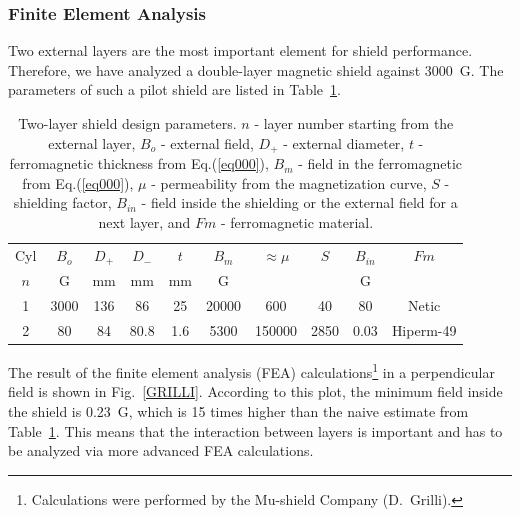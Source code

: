\subsubsection{Finite Element Analysis}

Two external layers are the most important element for shield performance.  
Therefore, we have analyzed a double-layer magnetic shield against 3000~G.  The 
parameters of such a pilot shield are listed in Table~\ref{ca001}. 

\begin{table}[htbp]
\begin{center}
\begin{tabular}{|c|c|c|c|c|c|c|c|c|c|} \hline
Cyl & $B_{o}$  & $D_+$ & $D_-$ & $t$ & $B_m$ & $\approx\mu$ & $S$  & $B_{in}$ & $Fm$      \\ 
$n$ &  G       & mm    & mm    & mm  & G     &              &      & G        &           \\ \hline  
1   & 3000     & 136   &   86  & 25  & 20000 & 600          & 40   & 80       & Netic     \\ \hline
2   & 80       &  84   &   80.8& 1.6 & 5300  & 150000       & 2850 & 0.03     & Hiperm-49 \\ \hline
\end{tabular}                                                      
\end{center}
\caption{\small{Two-layer shield design parameters. $n$ - layer number starting 
from the external layer, $B_{o}$ - external field, $D_+$ - external diameter, 
$t$ - ferromagnetic thickness from Eq.(\ref{eq000}), $B_m$ - field in the 
ferromagnetic from Eq.(\ref{eq000}), $\mu$ - permeability from the magnetization 
curve, $S$ - shielding factor, $B_{in}$ - field inside the shielding or the external 
field for a next layer, and $Fm$ - ferromagnetic material.}}
\label{ca001}
\end{table}
\clearpage

The result of the finite element analysis (FEA) calculations\footnote{Calculations 
were performed by the Mu-shield Company (D.~Grilli).} in a perpendicular field is 
shown in Fig.~\ref{GRILLI}.  According to this plot, the minimum field inside 
the shield is 0.23~G, which is 15 times higher than the naive estimate from  
Table~\ref{ca001}.  This means that the interaction between layers is 
important and has to be analyzed via more advanced FEA calculations.

